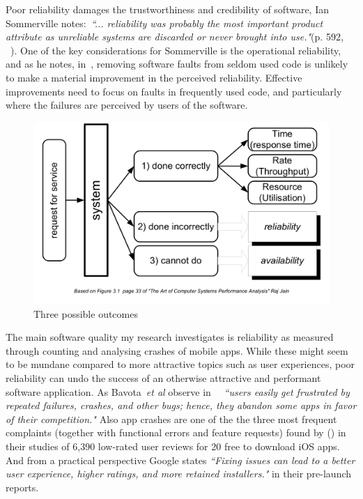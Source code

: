 Poor reliability damages the trustworthiness and credibility of software, Ian Sommerville notes:~\emph{``... reliability was probably the most important product attribute as unreliable systems are discarded or never brought into use."}(p. 592, ~\cite{sommerville1989_software_engineering}). One of the key considerations for Sommerville is the operational reliability, and as he notes, in~\cite{mills1987_cleanroom_software_engineering}, removing software faults from seldom used code is unlikely to make a material improvement in the perceived reliability. Effective improvements need to focus on faults in frequently used code, and particularly where the failures are perceived by users of the software.

\begin{figure}[ht]
    \centering
    \includegraphics[width=14cm]{images/commercetest/raj-jain-performance-reliability-availability.png}
    \caption{Three possible outcomes}
    \label{fig:three-possible-ourcomes}
\end{figure}

The main software quality my research investigates is reliability as measured through counting and analysing crashes of mobile apps. While these might seem to be mundane compared to more attractive topics such as user experiences, poor reliability can undo the success of an otherwise attractive and performant software application. As Bavota~\emph{et al} observe in~\cite{bavota2014_impact_of_api_change_android} ~\emph{``users easily get frustrated by repeated failures, crashes, and other bugs; hence, they abandon some apps in favor of their competition."} Also app crashes are one of the the three most frequent complaints (together with functional errors and feature requests) found by (\cite{khalid2015_what_do_mobile_app_users_complain_about}) in their studies of 6,390 low-rated user reviews for 20 free to download iOS apps. And from a practical perspective Google states \emph{``Fixing issues can lead to a better user experience, higher ratings, and more retained installers."} in their pre-launch reports.

